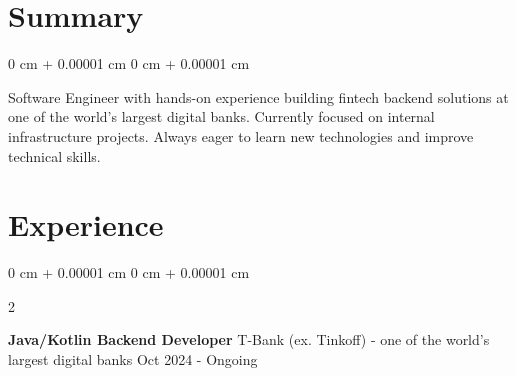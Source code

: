 \documentclass[10pt, letterpaper]{article}
\newenvironment{onecolentry}{
    \begin{adjustwidth}{
        0 cm + 0.00001 cm
    }{
        0 cm + 0.00001 cm
    }
}{
    \end{adjustwidth}
} %
\newenvironment{twocolentry}[2][]{
    \onecolentry
    \def\secondColumn{#2}
    \setcolumnwidth{\fill, 4.5 cm}
    \begin{paracol}{2}
}{
    \switchcolumn \raggedleft \secondColumn
    \end{paracol}
    \endonecolentry
} %
\begin{document}



     \section{Summary}

    \begin{onecolentry}
        \newline Software Engineer with hands-on experience building fintech backend solutions at one of the world's largest digital banks.
        Currently focused on internal infrastructure projects. Always eager to learn new technologies and improve technical skills.
    \end{onecolentry}






    \section{Experience}
        \begin{twocolentry}{
            Oct 2024 - Ongoing
        }
            \textbf{Java/Kotlin Backend Developer} 
            \newline T-Bank (ex. Tinkoff) - one of the world's largest digital banks\end{twocolentry}
\end{document}
